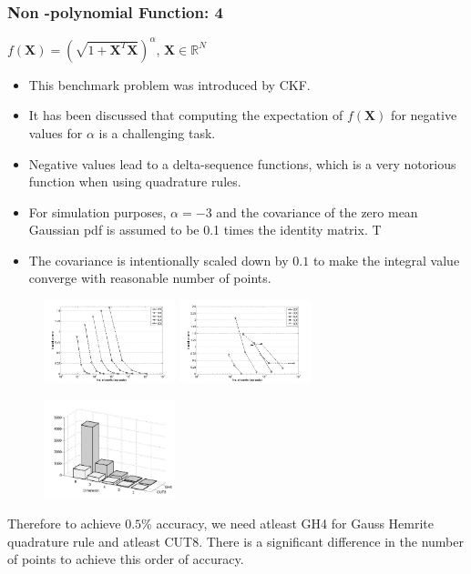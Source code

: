 \documentclass{beamer}
\begin{document}
\begin{frame}
\frametitle{Non -polynomial Function: 4}
$f(\mathbf{X})=(\sqrt{1+\mathbf{X}^T\mathbf{X}})^{\alpha}$, $\mathbf{X}\in\mathbb{R}^N$ 
\begin{itemize}[<+->]
\item This benchmark problem was introduced by CKF. 
\item It has been discussed that computing the expectation of $f(\mathbf{X})$ for negative values for  $\alpha$ is a challenging task. 
\item Negative values lead to a delta-sequence functions, which is a very notorious function when using quadrature rules.
\item For simulation purposes, $\alpha=-3$ and the covariance of the zero mean Gaussian pdf is assumed to be 0.1 times the identity matrix.  T
\item The covariance is intentionally scaled down by $0.1$ to make the integral value converge with reasonable number of points.
\end{itemize}
\end{frame}
\begin{frame}
\begin{figure}
   \centering
\includegraphics[width=1.5in]{gh_methods_err_vs_no_pm3}\label{pm3gh}
 \includegraphics[width=1.5in]{cut_methods_err_vs_no_pm3}\label{pm3cut}
 \end{figure}
 \begin{figure}
   \centering
  \includegraphics[width=1.5in]{no_of_pts_gh4_cut8}\label{pm3ghcutnopts}
   \end{figure}
   Therefore to achieve $0.5\%$ accuracy, we need atleast GH4 for Gauss Hemrite quadrature rule and atleast CUT8. There is a significant difference in the number of points to achieve this order of accuracy.
\end{frame}
\end{document}
